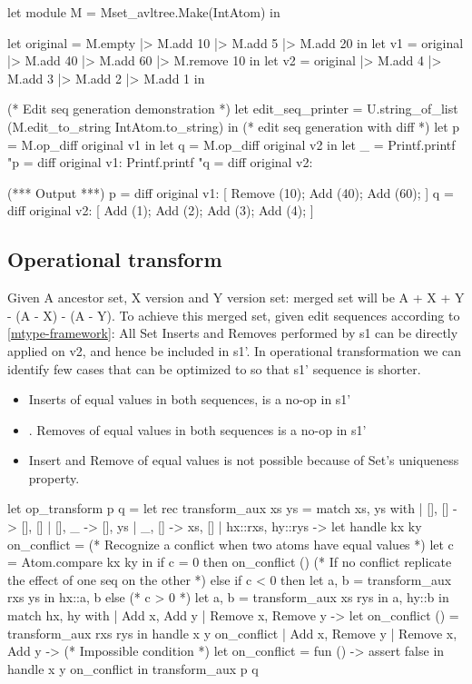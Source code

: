 \documentclass{article}
\begin{document}
\begin{longlisting}
let module M =  Mset_avltree.Make(IntAtom) in

let original = M.empty |> M.add 10 |> M.add 5 |> M.add 20 in
let v1 = original |> M.add 40 |> M.add 60 |> M.remove 10 in
let v2 = original |> M.add 4 |> M.add 3 |> M.add 2 |> M.add 1 in

(* Edit seq generation demonstration *)
let edit_seq_printer = U.string_of_list (M.edit_to_string IntAtom.to_string) in
(* edit seq generation with diff *)
let p = M.op_diff original v1 in
let q = M.op_diff original v2 in
let _ = 
  Printf.printf "p = diff original v1: %
  Printf.printf "q = diff original v2: %

(*** Output ***)
p = diff original v1: [ Remove (10); Add (40); Add (60); ]
q = diff original v2: [ Add (1); Add (2); Add (3); Add (4); ]
\end{longlisting}

\subsection{Operational transform}
Given A ancestor set, X version and Y version set: merged set will be A + X + Y - (A - X) - (A - Y).
To achieve this merged set, given edit sequences according to \ref{mtype-framework}: 
All Set Inserts and Removes performed by s1 can be directly applied on v2, and hence be included in s1'. 
In operational transformation we can identify few cases that can be optimized to so that s1' sequence is shorter.
\begin{itemize}
\item Inserts of equal values in both sequences, is a no-op in s1'
\item. Removes of equal values in both sequences is a no-op in s1'
\item Insert and Remove of equal values is not possible because of Set's uniqueness property.
\end{itemize}

\begin{longlisting}
let op_transform p q =
  let rec transform_aux xs ys =
    match xs, ys with
    | [], [] -> [], []
    | [], _ -> [], ys
    | _, [] -> xs, []   
    | hx::rxs, hy::rys ->
      let handle kx ky on_conflict =
        (* Recognize a conflict when two atoms have equal values *)
        let c = Atom.compare kx ky in
        if c = 0 then on_conflict ()
        (* If no conflict replicate the effect of one seq on the other  *)
        else if c < 0 then 
          let a, b = transform_aux rxs ys in
          hx::a, b
        else (* c > 0 *)
          let a, b = transform_aux xs rys in
          a, hy::b in
      match hx, hy with
      | Add x, Add y
      | Remove x, Remove y ->
        let on_conflict () = transform_aux rxs rys in
        handle x y on_conflict
      | Add x, Remove y 
      | Remove x, Add y ->
        (* Impossible condition *)
        let on_conflict = fun () -> assert false in
        handle x y on_conflict
  in
  transform_aux p q
\end{longlisting}
\end{document}
